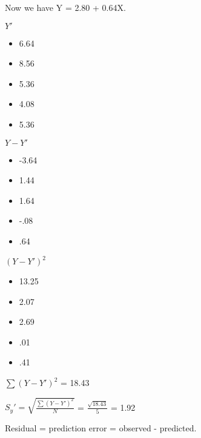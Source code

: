 \documentclass[11pt]{report}
\begin{document}
{    Now we have Y = 2.80 + 0.64X. \newline
    \begin{multicols}{3}
        $Y'$
        \begin{itemize}
            \item 6.64
            \item 8.56
            \item 5.36
            \item 4.08
            \item 5.36
        \end{itemize}
        \columnbreak
        $Y - Y'$
        \begin{itemize}
            \item -3.64
            \item 1.44
            \item 1.64
            \item -.08
            \item .64
        \end{itemize}
        \columnbreak
        $(Y - Y')^2$
        \begin{itemize}
            \item 13.25
            \item 2.07
            \item 2.69
            \item .01
            \item .41
        \end{itemize}
        $\sum(Y - Y')^2$ = 18.43
    \end{multicols}

    $S_y' = \sqrt{\frac{\sum(Y - Y')^2}{N}}$ = $\frac{\sqrt{18.43}}{5}$ = 1.92 \newline
}

Residual = prediction error = observed - predicted. \newline\newline 
\end{document}
